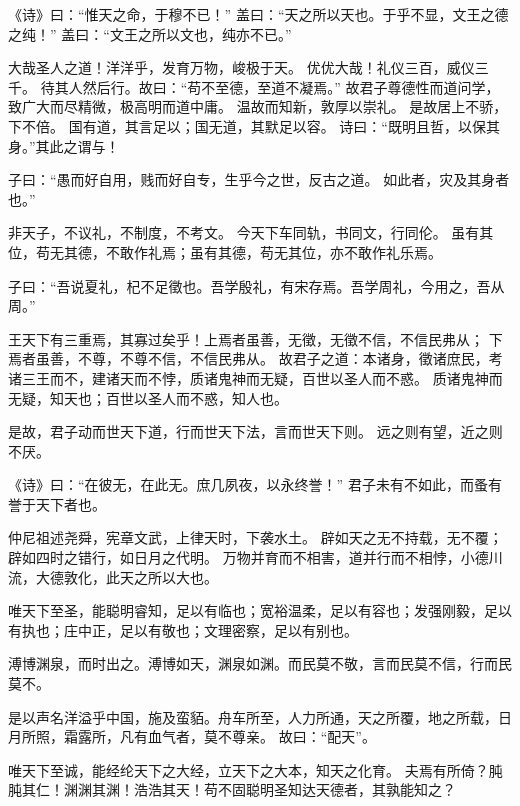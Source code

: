 \documentclass[twoside,openany]{book}
\begin{document}
\begin{pinyinscope}
《诗》曰：“惟天之命，于穆不已！”
盖曰：“天之所以天也。于乎不显，文王之德之纯！”
盖曰：“文王之所以文也，纯亦不已。”

大哉圣人之道！洋洋乎，发育万物，峻极于天。
优优大哉！礼仪三百，威仪三千。
待其人然后行。故曰：“苟不至德，至道不凝焉。”
故君子尊德性而道问学，致广大而尽精微，极高明而道中庸。
温故而知新，敦厚以崇礼。
是故居上不骄，下不倍。
国有道，其言足以；国无道，其默足以容。
诗曰：“既明且哲，以保其身。”其此之谓与！

子曰：“愚而好自用，贱而好自专，生乎今之世，反古之道。
如此者，灾及其身者也。”

非天子，不议礼，不制度，不考文。
今天下车同轨，书同文，行同伦。
虽有其位，苟无其德，不敢作礼焉；虽有其德，苟无其位，亦不敢作礼乐焉。

子曰：“吾说夏礼，杞不足徵也。吾学殷礼，有宋存焉。吾学周礼，今用之，吾从周。”

王天下有三重焉，其寡过矣乎！上焉者虽善，无徵，无徵不信，不信民弗从；
下焉者虽善，不尊，不尊不信，不信民弗从。
故君子之道：本诸身，徵诸庶民，考诸三王而不，建诸天而不悖，质诸鬼神而无疑，百世以圣人而不惑。
质诸鬼神而无疑，知天也；百世以圣人而不惑，知人也。

是故，君子动而世天下道，行而世天下法，言而世天下则。
远之则有望，近之则不厌。

《诗》曰：“在彼无，在此无。庶几夙夜，以永终誉！”
君子未有不如此，而蚤有誉于天下者也。

仲尼祖述尧舜，宪章文武，上律天时，下袭水土。
辟如天之无不持载，无不覆；辟如四时之错行，如日月之代明。
万物并育而不相害，道并行而不相悖，小德川流，大德敦化，此天之所以大也。

唯天下至圣，能聪明睿知，足以有临也；宽裕温柔，足以有容也；发强刚毅，足以有执也；庄中正，足以有敬也；文理密察，足以有别也。

溥博渊泉，而时出之。溥博如天，渊泉如渊。而民莫不敬，言而民莫不信，行而民莫不。

是以声名洋溢乎中国，施及蛮貊。舟车所至，人力所通，天之所覆，地之所载，日月所照，霜露所，凡有血气者，莫不尊亲。
故曰：“配天”。

唯天下至诚，能经纶天下之大经，立天下之大本，知天之化育。
夫焉有所倚？肫肫其仁！渊渊其渊！浩浩其天！苟不固聪明圣知达天德者，其孰能知之？


\end{pinyinscope}
\end{document}
